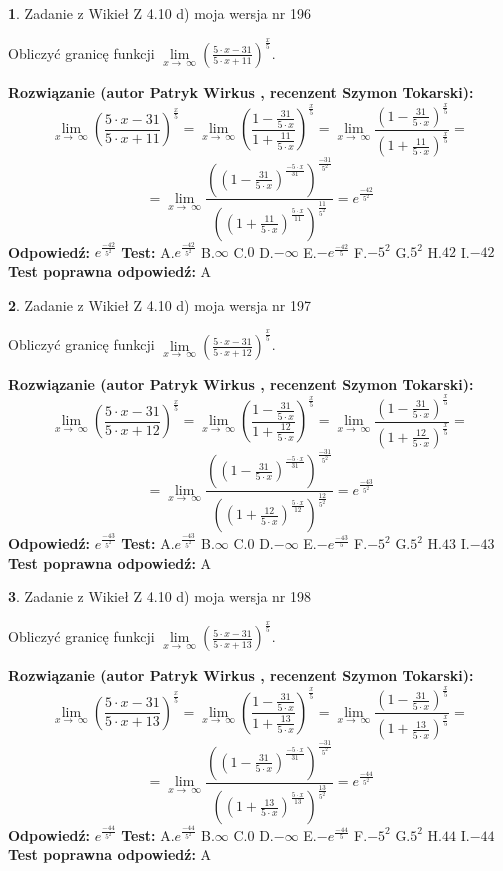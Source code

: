 \documentclass[12pt, a4paper]{article}
\theoremstyle{definition} %
\newtheorem{zad}{}
\newcommand{\zadStart}[1]{\begin{zad}#1\newline}
\newcommand{\zadStop}{\end{zad}}
\newcommand{\rozwStart}[2]{\noindent \textbf{Rozwiązanie (autor #1 , recenzent #2): }\newline}
\newcommand{\rozwStop}{\newline}
\newcommand{\odpStart}{\noindent \textbf{Odpowiedź:}\newline}
\newcommand{\odpStop}{\newline}
\newcommand{\testStart}{\noindent \textbf{Test:}\newline}
\newcommand{\testStop}{\newline}
\newcommand{\kluczStart}{\noindent \textbf{Test poprawna odpowiedź:}\newline}
\newcommand{\kluczStop}{\newline}
\begin{document}
\zadStart{Zadanie z Wikieł Z 4.10 d) moja wersja nr 196}


Obliczyć granicę funkcji  $\lim\limits_{x\to\ \infty}(\frac{5\cdot x-31}{5\cdot x+11})^{\frac{x}{5}}$.
\zadStop
\rozwStart{Patryk Wirkus}{Szymon Tokarski}
$$\lim\limits_{x\to\ \infty}(\frac{5\cdot x-31}{5\cdot x+11})^{\frac{x}{5}} = \lim\limits_{x\to\ \infty}(\frac{1-\frac{31}{5\cdot x}}{1+\frac{11}{5\cdot x}})^{\frac{x}{5}}=\lim\limits_{x\to\ \infty}\frac{(1-\frac{31}{5\cdot x})^{\frac{x}{5}}}{(1+\frac{11}{5\cdot x})^{\frac{x}{5}}}=$$
$$=\lim\limits_{x\to\ \infty}\frac{((1-\frac{31}{5\cdot x})^{\frac{-5\cdot x}{31}})^{\frac{-31}{5^{2}}}}{((1+\frac{11}{5\cdot x})^{\frac{5\cdot x}{11}})^{\frac{11}{5^{2}}}}=e^{\frac{-42}{5^{2}}}$$
\rozwStop
\odpStart
$e^{\frac{-42}{5^{2}}}$
\odpStop
\testStart
A.$e^{\frac{-42}{5^{2}}}$ B.$\infty$ C.$0$ D.$-\infty$ E.$-e^{\frac{-42}{5}}$
F.$-5^{2}$ G.$5^{2}$
H.$42$
I.$-42$
\testStop
\kluczStart
A
\kluczStop



\zadStart{Zadanie z Wikieł Z 4.10 d) moja wersja nr 197}


Obliczyć granicę funkcji  $\lim\limits_{x\to\ \infty}(\frac{5\cdot x-31}{5\cdot x+12})^{\frac{x}{5}}$.
\zadStop
\rozwStart{Patryk Wirkus}{Szymon Tokarski}
$$\lim\limits_{x\to\ \infty}(\frac{5\cdot x-31}{5\cdot x+12})^{\frac{x}{5}} = \lim\limits_{x\to\ \infty}(\frac{1-\frac{31}{5\cdot x}}{1+\frac{12}{5\cdot x}})^{\frac{x}{5}}=\lim\limits_{x\to\ \infty}\frac{(1-\frac{31}{5\cdot x})^{\frac{x}{5}}}{(1+\frac{12}{5\cdot x})^{\frac{x}{5}}}=$$
$$=\lim\limits_{x\to\ \infty}\frac{((1-\frac{31}{5\cdot x})^{\frac{-5\cdot x}{31}})^{\frac{-31}{5^{2}}}}{((1+\frac{12}{5\cdot x})^{\frac{5\cdot x}{12}})^{\frac{12}{5^{2}}}}=e^{\frac{-43}{5^{2}}}$$
\rozwStop
\odpStart
$e^{\frac{-43}{5^{2}}}$
\odpStop
\testStart
A.$e^{\frac{-43}{5^{2}}}$ B.$\infty$ C.$0$ D.$-\infty$ E.$-e^{\frac{-43}{5}}$
F.$-5^{2}$ G.$5^{2}$
H.$43$
I.$-43$
\testStop
\kluczStart
A
\kluczStop



\zadStart{Zadanie z Wikieł Z 4.10 d) moja wersja nr 198}


Obliczyć granicę funkcji  $\lim\limits_{x\to\ \infty}(\frac{5\cdot x-31}{5\cdot x+13})^{\frac{x}{5}}$.
\zadStop
\rozwStart{Patryk Wirkus}{Szymon Tokarski}
$$\lim\limits_{x\to\ \infty}(\frac{5\cdot x-31}{5\cdot x+13})^{\frac{x}{5}} = \lim\limits_{x\to\ \infty}(\frac{1-\frac{31}{5\cdot x}}{1+\frac{13}{5\cdot x}})^{\frac{x}{5}}=\lim\limits_{x\to\ \infty}\frac{(1-\frac{31}{5\cdot x})^{\frac{x}{5}}}{(1+\frac{13}{5\cdot x})^{\frac{x}{5}}}=$$
$$=\lim\limits_{x\to\ \infty}\frac{((1-\frac{31}{5\cdot x})^{\frac{-5\cdot x}{31}})^{\frac{-31}{5^{2}}}}{((1+\frac{13}{5\cdot x})^{\frac{5\cdot x}{13}})^{\frac{13}{5^{2}}}}=e^{\frac{-44}{5^{2}}}$$
\rozwStop
\odpStart
$e^{\frac{-44}{5^{2}}}$
\odpStop
\testStart
A.$e^{\frac{-44}{5^{2}}}$ B.$\infty$ C.$0$ D.$-\infty$ E.$-e^{\frac{-44}{5}}$
F.$-5^{2}$ G.$5^{2}$
H.$44$
I.$-44$
\testStop
\kluczStart
A
\kluczStop
\end{document}
